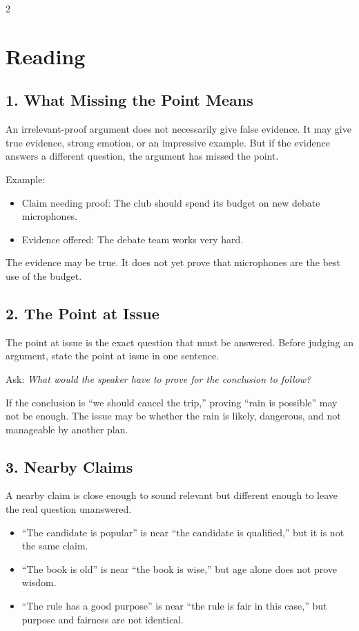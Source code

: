 \documentclass[12pt]{article}
\begin{document}
\begin{multicols}{2}
\section*{Reading}

\subsection*{1. What Missing the Point Means}
An irrelevant-proof argument does not necessarily give false evidence. It may give true evidence, strong emotion, or an impressive example. But if the evidence answers a different question, the argument has missed the point.

Example:
\begin{itemize}[leftmargin=*]
\item Claim needing proof: The club should spend its budget on new debate microphones.
\item Evidence offered: The debate team works very hard.
\end{itemize}
The evidence may be true. It does not yet prove that microphones are the best use of the budget.

\subsection*{2. The Point at Issue}
The point at issue is the exact question that must be answered. Before judging an argument, state the point at issue in one sentence.

Ask: \textit{What would the speaker have to prove for the conclusion to follow?}

If the conclusion is ``we should cancel the trip,'' proving ``rain is possible'' may not be enough. The issue may be whether the rain is likely, dangerous, and not manageable by another plan.

\subsection*{3. Nearby Claims}
A nearby claim is close enough to sound relevant but different enough to leave the real question unanswered.

\begin{itemize}[leftmargin=*]
\item ``The candidate is popular'' is near ``the candidate is qualified,'' but it is not the same claim.
\item ``The book is old'' is near ``the book is wise,'' but age alone does not prove wisdom.
\item ``The rule has a good purpose'' is near ``the rule is fair in this case,'' but purpose and fairness are not identical.
\end{itemize}


\end{multicols}
\end{document}
